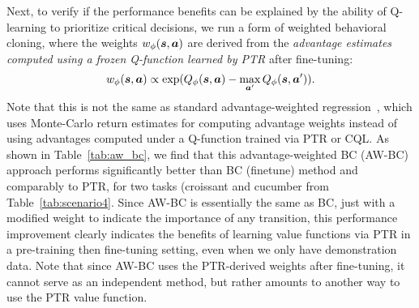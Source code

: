 \begin{table}[h]
\centering
\caption{\footnotesize{\textbf{Performance of advantage-weighted BC} on two tasks from Table~\ref{tab:scenario4}. Observe that weighting the BC objective using advantage estimates from the Q-function learned by \ptrmethodname leads to much better performance than standard BC (finetune), almost recovering PTR performance. This test indicates that the Q-function in \ptrmethodname allows us to be accurate on the more critical decisions, thereby preventing the failures of BC.}}
\vspace{-0.3cm}
\label{tab:aw_bc}
\end{table}

Next, to verify if the performance benefits can be explained by the ability of Q-learning to prioritize critical decisions, we run a form of weighted behavioral cloning, where the weights $w_\phi(\boldsymbol{s}, \boldsymbol{a})$ are derived from the \emph{advantage estimates computed using a frozen Q-function learned by PTR} after fine-tuning:
\begin{align*}
    w_\phi(\boldsymbol{s}, \boldsymbol{a})  \propto \exp(Q_\phi(\boldsymbol{s}, \boldsymbol{a}) - \max_{\boldsymbol{a}'} Q_\phi(\boldsymbol{s}, \boldsymbol{a}')).
\end{align*}
Note that this is not the same as standard advantage-weighted regression~\citep{peng2019awr}, which uses Monte-Carlo return estimates for computing advantage weights instead of using advantages computed under a Q-function trained via PTR or CQL. As shown in Table~\ref{tab:aw_bc}, we find that this advantage-weighted BC (AW-BC) approach performs significantly better than BC (finetune) method and comparably to PTR, for two tasks (croissant and cucumber from Table~\ref{tab:scenario4}. Since AW-BC is essentially the same as BC, just with a modified weight to indicate the importance of any transition, this performance improvement clearly indicates the benefits of learning value functions via PTR in a pre-training then fine-tuning setting, even when we only have demonstration data.  Note that since AW-BC uses the PTR-derived weights after fine-tuning, it cannot serve as an independent method, but rather amounts to another way to use the PTR value function.


